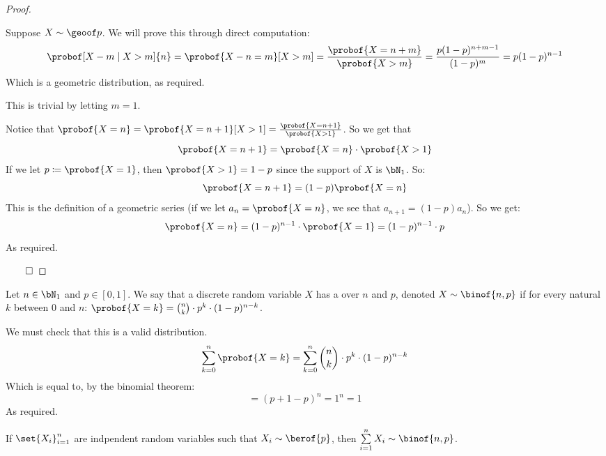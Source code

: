 \begin{proof}

	\begin{multiparitemize}[0pt]
		 Suppose $X\sim\geoof p$.
			We will prove this through direct computation:
			\[ \probof[X-m\mid X>m]{n} = \probof{X-n=m}[X>m] = \frac{\probof{X=n+m}}{\probof{X>m}} = \frac{p(1-p)^{n+m-1}}{(1-p)^m}
			= p(1-p)^{n-1} \]
			Which is a geometric distribution, as required.

		 This is trivial by letting $m=1$.

		 Notice that $\probof{X=n}=\probof{X=n+1}[X>1] = \frac{\probof{X=n+1}}{\probof{X>1}}$.
			So we get that 
			\[ \probof{X=n+1}=\probof{X=n}\cdot\probof{X>1} \]
			If we let $p\coloneqq\probof{X=1}$, then $\probof{X>1}=1-p$ since the support of $X$ is $\bN_1$.
			So:
			\[ \probof{X=n+1} = (1-p)\probof{X=n} \]
			This is the definition of a geometric series (if we let $a_n=\probof{X=n}$, we see that $a_{n+1}=(1-p)a_n$).
			So we get:
			\[ \probof{X=n} = (1-p)^{n-1}\cdot\probof{X=1} = (1-p)^{n-1}\cdot p \]
			As required.
	\end{multiparitemize}

	\hfill$\qed$

\end{proof}

\begin{defn*}

	Let $n\in\bN_1$ and $p\in[0,1]$.
	We say that a discrete random variable $X$ has a  over $n$ and $p$, denoted $X\sim\binof{n,p}$ if
	for every natural $k$ between $0$ and $n$:
	$\probof{X=k} = \binom{n}{k}\cdot p^k\cdot(1-p)^{n-k}$.

\end{defn*}

\begin{note}

	We must check that this is a valid distribution.
	\[ \sum_{k=0}^n\probof{X=k} = \sum_{k=0}^n\binom nk\cdot p^k\cdot (1-p)^{n-k} \]
	Which is equal to, by the binomial theorem:
	\[ = (p+1-p)^n = 1^n = 1 \]
	As required.

\end{note}

\begin{thrm*}

	If $\set{X_i}_{i=1}^n$ are indpendent random variables such that $X_i\sim\berof{p}$, then $\sum\limits_{i=1}^n X_i\sim\binof{n,p}$.

\end{thrm*}


